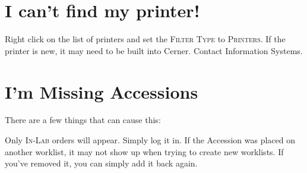\section{I can't find my printer!}

\begin{itemize}
     Right click on the list of printers and set the \textsc{Filter Type} to \textsc{Printers}.
     If the printer is new, it may need to be built into Cerner. Contact Information Systems.
\end{itemize}


\section{I'm Missing Accessions}

There are a few things that can cause this:

\begin{itemize}
     Only \textsc{In-Lab} orders will appear. Simply log it in.
     If the Accession was placed on another worklist, it may not show up when trying to create new worklists.
     If you've removed it, you can simply add it back again.
\end{itemize}